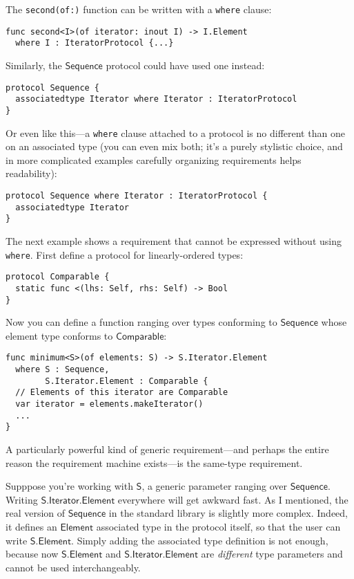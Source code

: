 \documentclass[headsepline,bibliography=totoc]{scrreport}
\newcommand{\namesym}[1]{\mathsf{#1}}
\newcommand{\genericparam}[1]{\bm{\mathsf{#1}}}
\newcommand{\proto}[1]{\bm{\mathsf{#1}}}
\theoremstyle{definition}
\theoremstyle{definition}
\theoremstyle{definition}
\begin{document}
\eject
The \texttt{second(of:)} function can be written with a \texttt{where} clause:
\begin{Verbatim}
func second<I>(of iterator: inout I) -> I.Element
  where I : IteratorProtocol {...}
\end{Verbatim}
Similarly, the $\proto{Sequence}$ protocol could have used one instead:
\begin{Verbatim}
protocol Sequence {
  associatedtype Iterator where Iterator : IteratorProtocol
}
\end{Verbatim}
Or even like this---a \texttt{where} clause attached to a protocol is no different than one on an associated type (you can even mix both; it's a purely stylistic choice, and in more complicated examples carefully organizing requirements helps readability):
\begin{Verbatim}
protocol Sequence where Iterator : IteratorProtocol {
  associatedtype Iterator
}
\end{Verbatim}

The next example shows a requirement that cannot be expressed without using \texttt{where}. First define a protocol for linearly-ordered types:
\begin{Verbatim}
protocol Comparable {
  static func <(lhs: Self, rhs: Self) -> Bool
}
\end{Verbatim}
Now you can define a function ranging over types conforming to $\proto{Sequence}$ whose element type conforms to $\proto{Comparable}$:
\begin{Verbatim}
func minimum<S>(of elements: S) -> S.Iterator.Element
  where S : Sequence,
        S.Iterator.Element : Comparable {
  // Elements of this iterator are Comparable
  var iterator = elements.makeIterator()
  ...
}
\end{Verbatim}
A particularly powerful kind of generic requirement---and perhaps the entire reason the requirement machine exists---is the same-type requirement.

Supppose you're working with $\genericparam{S}$, a generic parameter ranging over $\proto{Sequence}$. Writing $\genericparam{S}.\namesym{Iterator}.\namesym{Element}$ everywhere will get awkward fast. As I mentioned, the real version of $\proto{Sequence}$ in the standard library is slightly more complex. Indeed, it defines an $\namesym{Element}$ associated type in the protocol itself, so that the user can write $\genericparam{S}.\namesym{Element}$. Simply adding the associated type definition is not enough, because now $\genericparam{S}.\namesym{Element}$ and $\genericparam{S}.\namesym{Iterator}.\namesym{Element}$ are \emph{different} type parameters and cannot be used interchangeably.
\end{document}
